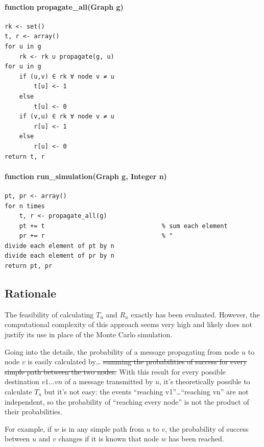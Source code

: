 \documentclass[oneside,openany]{memoir}
\begin{document}
\paragraph{function propagate\_all(Graph
g)}\label{function-propagateux5fallgraph-g}

\begin{verbatim}
rk <- set()
t, r <- array()
for u in g
    rk <- rk ∪ propagate(g, u)
for u in g
    if (u,v) ∈ rk ∀ node v ≠ u
        t[u] <- 1
    else
        t[u] <- 0
    if (v,u) ∈ rk ∀ node v ≠ u
        r[u] <- 1
    else
        r[u] <- 0
return t, r
\end{verbatim}

\paragraph{function run\_simulation(Graph g, Integer
n)}\label{function-runux5fsimulationgraph-g-integer-n}

\begin{verbatim}
pt, pr <- array()
for n times
    t, r <- propagate_all(g)
    pt += t                                % sum each element
    pr += r                                % "
divide each element of pt by n
divide each element of pr by n
return pt, pr
\end{verbatim}

\subsection{Rationale}\label{rationale}

The feasibility of calculating $T_u$ and $R_u$ exactly has been
evaluated. However, the computational complexity of this approach seems
very high and likely does not justify its use in place of the Monte
Carlo simulation.

Going into the details, the probability of a message propagating from
node $u$ to node $v$ is easily calculated by\ldots{} \sout{summing the
probabilities of success for every simple path between the two nodes.}
With this result for every possible destination $v1\ldots vn$ of a
message transmitted by $u$, it's theoretically possible to calculate
$T_u$ but it's not easy: the events ``reaching v1''\ldots{}``reaching
vn'' are not independent, so the probability of ``reaching every node''
is not the product of their probabilities.

For example, if $w$ is in any simple path from $u$ to $v$, the
probability of success between $u$ and $v$ changes if it is known that
node $w$ has been reached.
\end{document}
